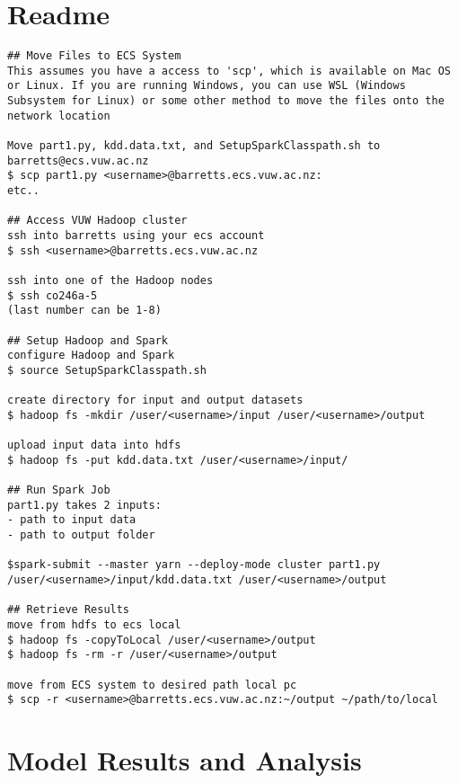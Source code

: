 \documentclass[12pt, letterpaper]{article}
\begin{document}
\section{Readme}
\begin{verbatim}
## Move Files to ECS System
This assumes you have a access to 'scp', which is available on Mac OS 
or Linux. If you are running Windows, you can use WSL (Windows 
Subsystem for Linux) or some other method to move the files onto the 
network location

Move part1.py, kdd.data.txt, and SetupSparkClasspath.sh to
barretts@ecs.vuw.ac.nz
$ scp part1.py <username>@barretts.ecs.vuw.ac.nz:
etc..

## Access VUW Hadoop cluster
ssh into barretts using your ecs account
$ ssh <username>@barretts.ecs.vuw.ac.nz

ssh into one of the Hadoop nodes 
$ ssh co246a-5
(last number can be 1-8)

## Setup Hadoop and Spark
configure Hadoop and Spark
$ source SetupSparkClasspath.sh

create directory for input and output datasets
$ hadoop fs -mkdir /user/<username>/input /user/<username>/output

upload input data into hdfs
$ hadoop fs -put kdd.data.txt /user/<username>/input/

## Run Spark Job
part1.py takes 2 inputs:
- path to input data
- path to output folder

$spark-submit --master yarn --deploy-mode cluster part1.py
/user/<username>/input/kdd.data.txt /user/<username>/output

## Retrieve Results
move from hdfs to ecs local
$ hadoop fs -copyToLocal /user/<username>/output
$ hadoop fs -rm -r /user/<username>/output

move from ECS system to desired path local pc
$ scp -r <username>@barretts.ecs.vuw.ac.nz:~/output ~/path/to/local
\end{verbatim}

\section{Model Results and Analysis}
\end{document}
